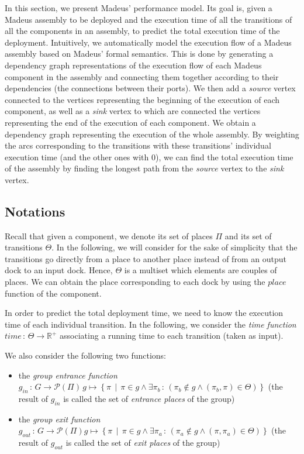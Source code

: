 In this section, we present Madeus' performance model. Its goal is,
given a Madeus assembly to be deployed and the execution time of all the
transitions of all the components in an assembly, to predict the total
execution time of the deployment.
%
Intuitively, we automatically model the execution flow of a Madeus
assembly based on Madeus' formal semantics. This is done by generating a
dependency graph representations of the execution flow of each Madeus
component in the assembly and connecting them together according to their
dependencies (the connections between their ports). We then add a
\emph{source} vertex connected to the vertices representing the beginning of
the execution of each component, as well as a \emph{sink} vertex to which
are connected the vertices representing the end of the execution of each
component.
%
We obtain a dependency graph representing the execution of the whole
assembly. By weighting the arcs corresponding to the transitions with
these transitions' individual execution time (and the other ones with 0),
we can find the total execution time of the assembly by finding the longest
path from the \emph{source} vertex to the \emph{sink} vertex.


\subsection{Notations}

Recall that given a component, we denote its set of places $\Pi$ and its
set of transitions $\Theta$. In the following, we will consider for the
sake of simplicity that the transitions go directly from a place to
another place instead of from an output dock to an input dock.
Hence, $\Theta$ is a multiset which elements are couples of places. We
can obtain the place corresponding to each dock by using the $place$
function of the component.

In order to predict the total deployment time, we need to know the
execution time of each individual transition. In the following, we
consider the \emph{time function} $time\,:\,\Theta\rightarrow\mathbb{R}^{+}$
associating a running time to each transition (taken as input).

We also consider the following two functions:
\begin{itemize}
\item the \emph{group entrance function} $g_{in}\,:\,G\rightarrow\mathcal{P}\left(\Pi\right)\,g\mapsto\left\{ \pi\,\mid\,\pi\in g\land\exists\pi_{b}\,:\,\left(\pi_{b}\not\in g\land\left(\pi_{b},\pi\right)\in\Theta\right)\right\} $
(the result of $g_{in}$ is called the set of \emph{entrance places}
of the group)
\item the \emph{group exit function} $g_{out}\,:\,G\rightarrow\mathcal{P}\left(\Pi\right)g\mapsto\left\{ \pi\,\mid\,\pi\in g\land\exists\pi_{a}\,:\,\left(\pi_{a}\not\in g\land\left(\pi,\pi_{a}\right)\in\Theta\right)\right\} $
(the result of $g_{out}$ is called the set of \emph{exit places}
of the group)
\end{itemize}

